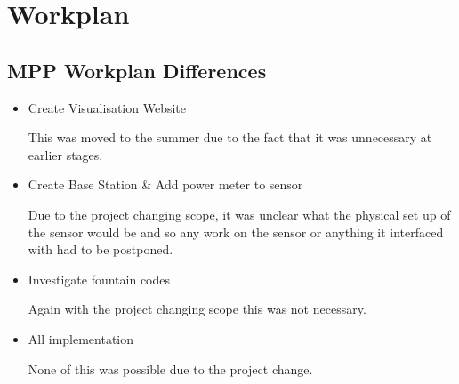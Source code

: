 \section{Workplan}\label{workplan}

\subsection{MPP Workplan Differences}

\begin{itemize}

\item Create Visualisation Website

	This was moved to the summer due to the fact that it was unnecessary at earlier stages. 

\item Create Base Station \& Add power meter to sensor

	Due to the project changing scope, it was unclear what the physical set up of the sensor would be and so any work on the sensor or anything it interfaced with had to be postponed. 

\item Investigate fountain codes
	
	Again with the project changing scope this was not necessary. 

\item All implementation

	None of this was possible due to the project change. 

\end{itemize}






